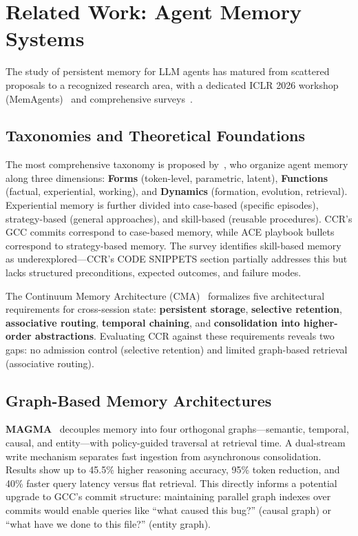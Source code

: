 \documentclass[11pt]{article}
\begin{document}
\section{Related Work: Agent Memory Systems}
\label{sec:memory}

The study of persistent memory for LLM agents has matured from scattered proposals to a recognized research area, with a dedicated ICLR 2026 workshop (MemAgents)~\cite{memagents_workshop} and comprehensive surveys~\cite{memory_survey, graph_memory_survey}.

\subsection{Taxonomies and Theoretical Foundations}

The most comprehensive taxonomy is proposed by~\cite{memory_survey}, who organize agent memory along three dimensions: \textbf{Forms} (token-level, parametric, latent), \textbf{Functions} (factual, experiential, working), and \textbf{Dynamics} (formation, evolution, retrieval). Experiential memory is further divided into case-based (specific episodes), strategy-based (general approaches), and skill-based (reusable procedures). CCR's GCC commits correspond to case-based memory, while ACE playbook bullets correspond to strategy-based memory. The survey identifies skill-based memory as underexplored---CCR's CODE SNIPPETS section partially addresses this but lacks structured preconditions, expected outcomes, and failure modes.

The Continuum Memory Architecture (CMA)~\cite{cma} formalizes five architectural requirements for cross-session state: \textbf{persistent storage}, \textbf{selective retention}, \textbf{associative routing}, \textbf{temporal chaining}, and \textbf{consolidation into higher-order abstractions}. Evaluating CCR against these requirements reveals two gaps: no admission control (selective retention) and limited graph-based retrieval (associative routing).

\subsection{Graph-Based Memory Architectures}

\textbf{MAGMA}~\cite{magma} decouples memory into four orthogonal graphs---semantic, temporal, causal, and entity---with policy-guided traversal at retrieval time. A dual-stream write mechanism separates fast ingestion from asynchronous consolidation. Results show up to 45.5\% higher reasoning accuracy, 95\% token reduction, and 40\% faster query latency versus flat retrieval. This directly informs a potential upgrade to GCC's commit structure: maintaining parallel graph indexes over commits would enable queries like ``what caused this bug?'' (causal graph) or ``what have we done to this file?'' (entity graph).
\end{document}

